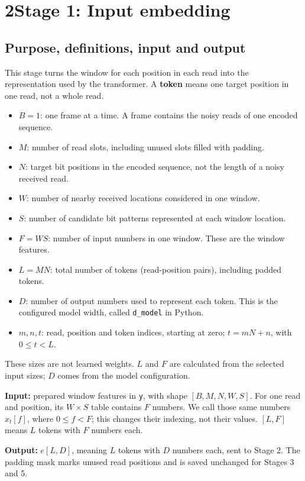 \documentclass[11pt,a4paper]{article}
\begin{document}
\newpage
\section*{2\quad Stage 1: Input embedding}
\subsection*{Purpose, definitions, input and output}
This stage turns the window for each position in each read into the representation used by the transformer. A \textbf{token} means one target position in one read, not a whole read.
\begin{itemize}
\item $B=1$: one frame at a time. A frame contains the noisy reads of one encoded sequence.
\item $M$: number of read slots, including unused slots filled with padding.
\item $N$: target bit positions in the encoded sequence, not the length of a noisy received read.
\item $W$: number of nearby received locations considered in one window.
\item $S$: number of candidate bit patterns represented at each window location.
\item $F=WS$: number of input numbers in one window. These are the window features.
\item $L=MN$: total number of tokens (read-position pairs), including padded tokens.
\item $D$: number of output numbers used to represent each token. This is the configured model width, called \texttt{d\_model} in Python.
\item $m,n,t$: read, position and token indices, starting at zero; $t=mN+n$, with $0\leq t<L$.
\end{itemize}
These sizes are not learned weights. $L$ and $F$ are calculated from the selected input sizes; $D$ comes from the model configuration.

\textbf{Input:} prepared window features in \texttt{y}, with shape $[B,M,N,W,S]$. For one read and position, its $W\times S$ table contains $F$ numbers. We call those same numbers $x_t[f]$, where $0\leq f<F$; this changes their indexing, not their values. $[L,F]$ means $L$ tokens with $F$ numbers each.

\textbf{Output:} $e[L,D]$, meaning $L$ tokens with $D$ numbers each, sent to Stage 2. The padding mask marks unused read positions and is saved unchanged for Stages 3 and 5.
\end{document}
